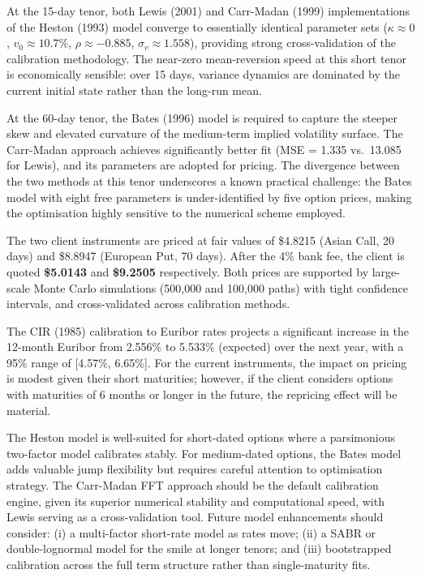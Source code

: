 \documentclass[12pt,a4paper]{article}
\begin{document}
At the 15-day tenor, both Lewis (2001) and Carr-Madan (1999) implementations of the Heston (1993) model converge to essentially identical parameter sets ($\kappa \approx 0$, $v_0 \approx 10.7\%$, $\rho \approx -0.885$, $\sigma_v \approx 1.558$), providing strong cross-validation of the calibration methodology. The near-zero mean-reversion speed at this short tenor is economically sensible: over 15 days, variance dynamics are dominated by the current initial state rather than the long-run mean.

At the 60-day tenor, the Bates (1996) model is required to capture the steeper skew and elevated curvature of the medium-term implied volatility surface. The Carr-Madan approach achieves significantly better fit (MSE = 1.335 vs.\ 13.085 for Lewis), and its parameters are adopted for pricing. The divergence between the two methods at this tenor underscores a known practical challenge: the Bates model with eight free parameters is under-identified by five option prices, making the optimisation highly sensitive to the numerical scheme employed.

The two client instruments are priced at fair values of \$4.8215 (Asian Call, 20 days) and \$8.8947 (European Put, 70 days). After the 4\% bank fee, the client is quoted \textbf{\$5.0143} and \textbf{\$9.2505} respectively. Both prices are supported by large-scale Monte Carlo simulations (500,000 and 100,000 paths) with tight confidence intervals, and cross-validated across calibration methods.

The CIR (1985) calibration to Euribor rates projects a significant increase in the 12-month Euribor from 2.556\% to 5.533\% (expected) over the next year, with a 95\% range of [4.57\%, 6.65\%]. For the current instruments, the impact on pricing is modest given their short maturities; however, if the client considers options with maturities of 6 months or longer in the future, the repricing effect will be material.

The Heston model is well-suited for short-dated options where a parsimonious two-factor model calibrates stably. For medium-dated options, the Bates model adds valuable jump flexibility but requires careful attention to optimisation strategy. The Carr-Madan FFT approach should be the default calibration engine, given its superior numerical stability and computational speed, with Lewis serving as a cross-validation tool. Future model enhancements should consider: (i) a multi-factor short-rate model as rates move; (ii) a SABR or double-lognormal model for the smile at longer tenors; and (iii) bootstrapped calibration across the full term structure rather than single-maturity fits.
\end{document}
